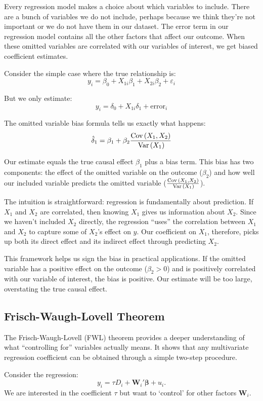 \documentclass[12pt]{article}
\begin{document}
\begin{multicols}{2}
Every regression model makes a choice about which variables to include.
There are a bunch of variables we do not include, perhaps because we think they're not important or we do not have them in our dataset.
The error term in our regression model contains all the other factors that affect our outcome.
When these omitted variables are correlated with our variables of interest, we get biased coefficient estimates.

Consider the simple case where the true relationship is:
$$y_i = \beta_0 + X_{1i}\beta_1 + X_{2i}\beta_2 + \varepsilon_i$$

But we only estimate:
$$y_i = \delta_0 + X_{1i}\delta_1 + \text{error}_i$$

The omitted variable bias formula tells us exactly what happens:
$$\hat{\delta}_1 = \beta_1 + \beta_2 \frac{\cov{X_1, X_2}}{\var{X_1}}$$

Our estimate equals the true causal effect $\beta_1$ plus a bias term.
This bias has two components: the effect of the omitted variable on the outcome ($\beta_2$) and how well our included variable predicts the omitted variable ($\frac{\cov{X_1, X_2}}{\var{X_1}}$).

The intuition is straightforward: regression is fundamentally about prediction.
If $X_1$ and $X_2$ are correlated, then knowing $X_1$ gives us information about $X_2$.
Since we haven't included $X_2$ directly, the regression ``uses'' the correlation between $X_1$ and $X_2$ to capture some of $X_2$'s effect on $y$.
Our coefficient on $X_1$, therefore, picks up both its direct effect and its indirect effect through predicting $X_2$.

This framework helps us sign the bias in practical applications.
If the omitted variable has a positive effect on the outcome ($\beta_2 > 0$) and is positively correlated with our variable of interest, the bias is positive.
Our estimate will be too large, overstating the true causal effect.

\subsection*{Frisch-Waugh-Lovell Theorem}

The Frisch-Waugh-Lovell (FWL) theorem provides a deeper understanding of what ``controlling for'' variables actually means.
It shows that any multivariate regression coefficient can be obtained through a simple two-step procedure.

Consider the regression:
$$y_i = \tau D_i + \bm{W}_i'\boldsymbol{\beta} + u_i.$$
We are interested in the coefficient $\tau$ but want to `control' for other factors $\bm{W}_i$.


\end{multicols}
\end{document}
